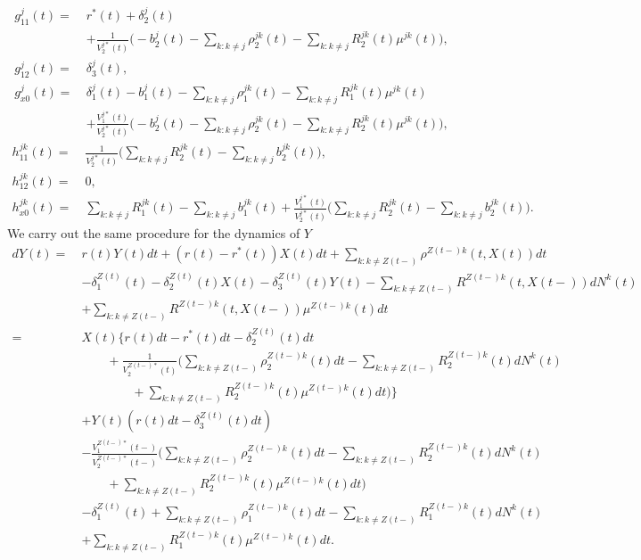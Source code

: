 \documentclass[12pt]{article}
\theoremstyle{my_thm}
\theoremstyle{my_rem}
\begin{document}
\begin{align*}
g^j_{11}(t)= \ &r^*(t)  +\delta_2^j(t)\\
&+\frac{1}{V_2^{j*}(t)}\bigg(
-b^j_2(t)-\sum_{k:k\neq j}\rho_2^{jk}(t)-\sum_{k:k\neq j}R_2^{jk}(t)\mu^{jk}(t)
\bigg),
\\
g^j_{12}(t)= \ &\delta_3^j(t),
\\
g^j_{x0}(t)= \ & \delta_1^{j}(t) 
-b_1^{j}(t)
-\sum_{k:k\neq j} \rho^{jk}_1(t) -\sum_{k:k\neq j} R^{jk}_1(t) \mu^{jk}(t)
\\
&+
\frac{V^{j*}_1(t)}{V^{j*}_2(t)}
\bigg( -b_2^{j}(t)-\sum_{k:k\neq j} \rho^{jk}_2(t) -\sum_{k:k\neq j} R^{jk}_2(t) \mu^{jk}(t) \bigg),
\end{align*}
\begin{align*}
h^{jk}_{11}(t)= \ & \frac{1}{V_2^{j*}(t)} \bigg( 
\sum_{k:k\neq j}R_2^{jk}(t)-\sum_{k:k\neq j}b_2^{jk}(t)
\bigg),
\\
h^{jk}_{12}(t)= \ & 0 ,
\\
h^{jk}_{x0}(t)= \ & 
\sum_{k:k\neq j} R^{jk}_1(t) -\sum_{k:k\neq j}b_1^{jk}(t)
+
\frac{V^{j*}_1(t)}{V^{j*}_2(t)}
\bigg( \sum_{k:k\neq j} R^{jk}_2(t)-\sum_{k:k\neq j}b_2^{jk}(t)  \bigg).
\end{align*}
We carry out the same procedure for the dynamics of $Y$
\begin{align*}
dY(t)= \ &
r(t) Y(t) dt +(r(t)-r^*(t))X(t)dt+\sum_{k:k\neq Z(t-)} \rho^{Z(t-)k}(t,X(t)) dt
\\
&-\delta_1^{Z(t)}(t)-\delta_2^{Z(t)}(t)X(t)-\delta_3^{Z(t)}(t)Y(t)-
\sum_{k:k \neq Z(t-)}  R^{Z(t-)k}(t,X(t-)) dN^k(t)
\\
&+
\sum_{k:k \neq Z(t-)}  R^{Z(t-)k}(t,X(t-)) \mu^{Z(t-)k}(t) dt
\\
= \ &
X(t) \bigg\lbrace 
r(t)dt-r^*(t)dt -\delta_2^{Z(t)}(t)dt
\\
& \qquad + \frac{1}{V_2^{Z(t-)*}(t)} \bigg( 
\sum_{k:k\neq Z(t-)} \rho_2^{Z(t-)k}(t) dt
-\sum_{k:k \neq Z(t-)}  R^{Z(t-)k}_2(t) dN^k(t)
\\
&
\qquad \qquad +\sum_{k:k \neq Z(t-)}  R^{Z(t-)k}_2(t) \mu^{Z(t-)k}(t) dt
\bigg)
\bigg\rbrace
\\
&+ Y(t)( 
r(t) dt-\delta_3^{Z(t)}(t) dt)
\\
&- \frac{V_1^{Z(t-)*}(t-)}{V_2^{Z(t-)*}(t-)}\bigg(
\sum_{k:k\neq Z(t-)} \rho^{Z(t-)k}_2(t) dt
-\sum_{k:k\neq Z(t-)} R^{Z(t-)k}_2(t) dN^k(t)
\\
&\qquad  +\sum_{k:k\neq Z(t-)} R^{Z(t-)k}_2(t) \mu^{Z(t-)k}(t) dt
\bigg)
\\
&-\delta_1^{Z(t)}(t)
+
\sum_{k:k\neq Z(t-)} \rho^{Z(t-)k}_1(t) dt
-
\sum_{k:k \neq Z(t-)}  R_1^{Z(t-)k}(t) dN^k(t)
\\&
+\sum_{k:k \neq Z(t-)}  R_1^{Z(t-)k}(t) \mu^{Z(t-)k}(t) dt.
\end{align*}
\end{document}
